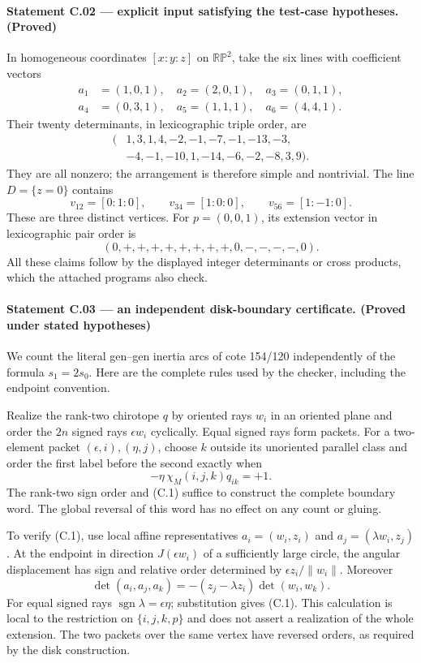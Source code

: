\documentclass[11pt,a4paper]{article}
\begin{document}
\paragraph{Statement C.02 --- explicit input satisfying the test-case hypotheses. (Proved)}\label{C.02}
In homogeneous coordinates $[x:y:z]$ on $\mathbb{RP}^2$, take the six
lines with coefficient vectors
\[
\begin{split}
 a_1&=(1,0,1),\quad a_2=(2,0,1),\quad
 a_3=(0,1,1),\\
 a_4&=(0,3,1),\quad a_5=(1,1,1),\quad
 a_6=(4,4,1).
\end{split}
\]
Their twenty determinants, in lexicographic triple order, are
\[
\begin{split}
(&1,3,1,4,-2,-1,-7,-1,-13,-3,\\
 &-4,-1,-10,1,-14,-6,-2,-8,3,9).
\end{split}
\]
They are all nonzero; the arrangement is therefore simple and
nontrivial. The line $D=\{z=0\}$ contains
\[
 v_{12}=[0:1:0],\qquad
 v_{34}=[1:0:0],\qquad
 v_{56}=[1:-1:0].
\]
These are three distinct vertices. For $p=(0,0,1)$, its extension
vector in lexicographic pair order is
\[
 (0,+,+,+,+,+,+,+,+,0,-,-,-,-,0).
\]
All these claims follow by the displayed integer determinants or
cross products, which the attached programs also check.

\paragraph{Statement C.03 --- an independent disk-boundary certificate. (Proved under stated hypotheses)}\label{C.03}
We count the literal gen--gen inertia arcs of cote 154/120 independently
of the formula $s_1=2s_0$. Here are the complete rules used by the
checker, including the endpoint convention.

Realize the rank-two chirotope $q$ by oriented rays $w_i$ in an
oriented plane and order the $2n$ signed rays $\epsilon w_i$
cyclically. Equal signed rays form packets. For a two-element packet
$(\epsilon,i),(\eta,j)$, choose $k$ outside its unoriented parallel
class and order the first label before the second exactly when
\[
 -\eta\,\chi_M(i,j,k)q_{ik}=+1.                 \tag{C.1}
\]
The rank-two sign order and (C.1) suffice to construct the complete
boundary word. The global reversal of this word has no effect on
any count or gluing.

To verify (C.1), use local affine representatives
$a_i=(w_i,z_i)$ and $a_j=(\lambda w_i,z_j)$. At the endpoint in
direction $J(\epsilon w_i)$ of a sufficiently large circle,
the angular displacement has sign and relative order determined by
$\epsilon z_i/\lVert w_i\rVert$. Moreover
\[
 \det(a_i,a_j,a_k)
 =-(z_j-\lambda z_i)\det(w_i,w_k).
\]
For equal signed rays $\operatorname{sgn}\lambda=\epsilon\eta$;
substitution gives (C.1). This calculation is local to the
restriction on $\{i,j,k,p\}$ and does not assert a realization of
the whole extension. The two packets over the same vertex have
reversed orders, as required by the disk construction.
\end{document}
